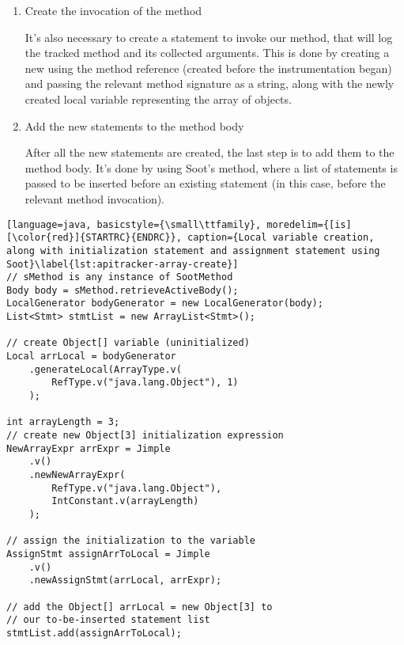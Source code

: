 \begin{enumerate}
\begin{enumerate}
        After we're sure that the class implements the  method, a new invoke expression statement is created, along with the assignment statement for the created variable. The boxed value is now ready to be inserted into our array of objects, and this is also done by creating a new Soot statement.
    \end{enumerate}

    \item Create the invocation of the  method

    It's also necessary to create a statement to invoke our  method, that will log the tracked method and its collected arguments. This is done by creating a new  using the  method reference (created before the instrumentation began) and passing the relevant method signature as a string, along with the newly created local variable representing the array of objects.

    \item Add the new statements to the method body

    After all the new statements are created, the last step is to add them to the method body. It's done by using Soot's  method, where a list of statements is passed to be inserted before an existing statement (in this case, before the relevant method invocation).
\end{enumerate}

\begin{lstlisting}[language=java, basicstyle={\small\ttfamily}, moredelim={[is][\color{red}]{STARTRC}{ENDRC}}, caption={Local variable creation, along with initialization statement and assignment statement using Soot}\label{lst:apitracker-array-create}]
// sMethod is any instance of SootMethod
Body body = sMethod.retrieveActiveBody();
LocalGenerator bodyGenerator = new LocalGenerator(body);
List<Stmt> stmtList = new ArrayList<Stmt>();

// create Object[] variable (uninitialized)
Local arrLocal = bodyGenerator
    .generateLocal(ArrayType.v(
        RefType.v("java.lang.Object"), 1)
    );

int arrayLength = 3;
// create new Object[3] initialization expression
NewArrayExpr arrExpr = Jimple
    .v()
    .newNewArrayExpr(
        RefType.v("java.lang.Object"), 
        IntConstant.v(arrayLength)
    );

// assign the initialization to the variable
AssignStmt assignArrToLocal = Jimple
    .v()
    .newAssignStmt(arrLocal, arrExpr);

// add the Object[] arrLocal = new Object[3] to
// our to-be-inserted statement list
stmtList.add(assignArrToLocal);
\end{lstlisting}

